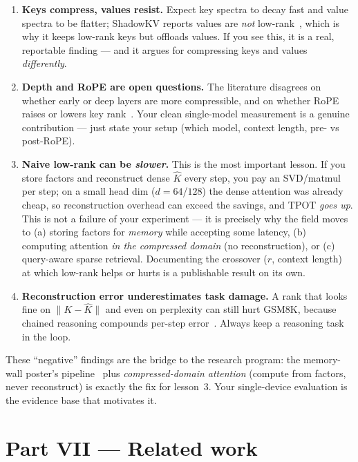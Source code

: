 \documentclass[11pt]{article}
\newcommand{\term}[1]{\textbf{\color{accent!85!black}#1}}
\begin{document}
\begin{enumerate}[leftmargin=1.5em,itemsep=2pt]
\item \term{Keys compress, values resist.} Expect key spectra to decay fast and value spectra to
be flatter; ShadowKV reports values are \emph{not} low-rank~\cite{shadowkv}, which is why it keeps
low-rank keys but offloads values. If you see this, it is a real, reportable finding --- and it
argues for compressing keys and values \emph{differently}.
\item \term{Depth and RoPE are open questions.} The literature disagrees on whether early or deep
layers are more compressible, and on whether RoPE raises or lowers key
rank~\cite{shadowkv,lorc}. Your clean single-model measurement is a genuine contribution --- just
state your setup (which model, context length, pre- vs post-RoPE).
\item \term{Naive low-rank can be \emph{slower}.} This is the most important lesson. If you store
factors and reconstruct dense $\hat K$ every step, you pay an SVD/matmul per step; on a small head
dim ($d=64$/$128$) the dense attention was already cheap, so reconstruction overhead can exceed
the savings, and TPOT \emph{goes up}. This is not a failure of your experiment --- it is precisely
why the field moves to (a) storing factors for \emph{memory} while accepting some latency, (b)
computing attention \emph{in the compressed domain} (no reconstruction), or (c) query-aware sparse
retrieval. Documenting the crossover ($r$, context length) at which low-rank helps or hurts is a
publishable result on its own.
\item \term{Reconstruction error underestimates task damage.} A rank that looks fine on
$\lVert K-\hat K\rVert$ and even on perplexity can still hurt GSM8K, because chained reasoning
compounds per-step error~\cite{gear}. Always keep a reasoning task in the loop.
\end{enumerate}

\begin{keybox}
These ``negative'' findings are the bridge to the research program: the memory-wall poster's
pipeline~\cite{poster} plus \emph{compressed-domain attention} (compute from factors, never
reconstruct) is exactly the fix for lesson~3. Your single-device evaluation is the evidence base
that motivates it.
\end{keybox}

\part*{Part VII \;---\; Related work}
\end{document}
